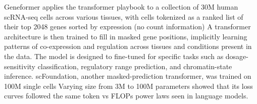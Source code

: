 Geneformer applies the transformer playbook to a collection of 30M human scRNA-seq cells across various tissues, with cells tokenized as a ranked list of their top 2048 genes sorted by expression (no count information) A transformer architecture is then trained to fill in masked gene positions, implicitly learning patterns of co-expression and regulation across tissues and conditions present in the data. The model is designed to fine-tuned for specific tasks such as dosage-sensitivity classification, regulatory range prediction, and chromatin-state inference. scFoundation, another masked-prediction transformer, was trained on 100M single cells Varying size from 3M to 100M parameters showed that its loss curves followed the same token vs FLOPs power laws seen in language models.
